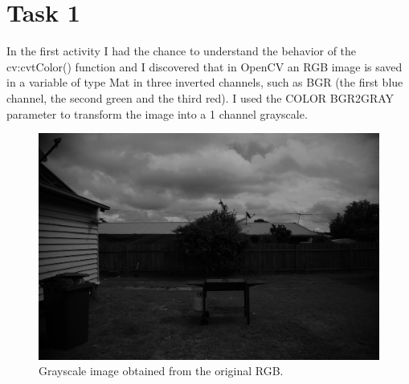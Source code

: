 
%
%         

%





\chapter{Task 1}
In the first activity I had the chance to understand the behavior of the cv:cvtColor() function and I discovered that in OpenCV an RGB image is saved in a variable of type Mat in three inverted channels, such as BGR (the first blue channel, the second green and the third red). I used the COLOR BGR2GRAY parameter to transform the image into a 1 channel grayscale.

\begin{figure}[!h]
	\centering
	\begin{minipage}{1\textwidth}
		\centering
		\includegraphics[width=\linewidth]{images/source/task1/1}
		\caption{Grayscale image obtained from the original RGB.}
		\label{fig:1}
	\end{minipage}
\end{figure}


